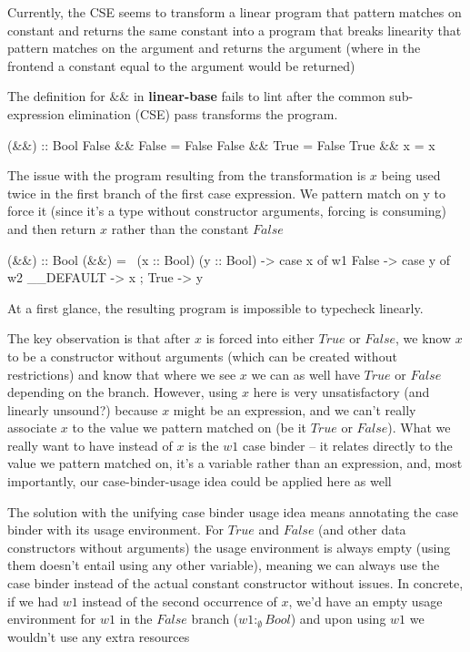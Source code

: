 \documentclass[a4paper, draft]{article}
\begin{document}
Currently, the CSE seems to transform a linear program that pattern matches on
constant and returns the same constant into a program that breaks linearity that
pattern matches on the argument and returns the argument (where in the frontend
a constant equal to the argument would be returned)

The definition for $\&\&$ in \textbf{linear-base} fails to lint after the common
sub-expression elimination (CSE) pass transforms the program.
\begin{code}
(&&) :: Bool %
False && False = False
False && True = False
True && x = x
\end{code}
The issue with the program resulting from the transformation is $x$ being used
twice in the first branch of the first case expression. We pattern match on y to
force it (since it's a type without constructor arguments, forcing is consuming)
and then return $x$ rather than the constant $False$
\begin{code}
(&&) :: Bool %
(&&) = \ (x :: Bool) (y :: Bool) ->
  case x of w1 {
    False -> case y of w2 { __DEFAULT -> x };
    True -> y
  }
\end{code}
At a first glance, the resulting program is impossible to typecheck linearly.

The key observation is that after $x$ is forced into either $True$ or $False$,
we know $x$ to be a constructor without arguments (which can be created
without restrictions) and know that where we see $x$ we can as well have
$True$ or $False$ depending on the branch. However, using $x$ here is very
unsatisfactory (and linearly unsound?) because $x$ might be an expression, and
we can't really associate $x$ to the value we pattern matched on (be it $True$
or $False$). What we really want to have instead of $x$ is the $w1$ case binder --
it relates directly to the value we pattern matched on, it's a variable rather
than an expression, and, most importantly, our case-binder-usage idea could be
applied here as well


The solution with the unifying case binder usage idea means annotating the case
binder with its usage environment. For $True$ and $False$ (and other data
constructors without arguments) the usage environment is always empty (using
them doesn't entail using any other variable), meaning we can always use the
case binder instead of the actual constant constructor without issues.
%
In concrete, if we had $w1$ instead of the second occurrence of $x$, we'd have
an empty usage environment for $w1$ in the $False$ branch ($w1 :_\emptyset
Bool$) and upon using $w1$ we wouldn't use any extra resources
\end{document}
